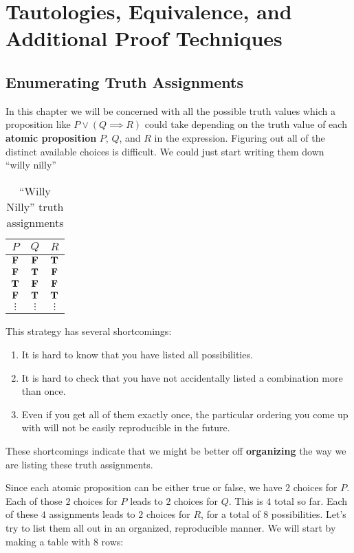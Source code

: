 \chapter{Tautologies, Equivalence, and Additional Proof Techniques}

\section{Enumerating Truth Assignments}

In this chapter we will be concerned with all the possible truth values which a proposition like $P \vee (Q \implies R)$ could take depending on the truth value of each \textbf{atomic proposition}  $P$, $Q$, and $R$ in the expression.  Figuring out all of the distinct available choices is difficult.  We could just start writing them down ``willy nilly''

		\begin{table}[h!]
	\begin{center}
		\caption{``Willy Nilly'' truth assignments}
		\begin{tabular}{c|c|c} 
			$P$ & $Q$ & $R$ \\
			\hline
			$\textbf{\textrm{F}}$ & $\textbf{\textrm{F}}$ & $\textbf{\textrm{T}}$ \\ 
			$\textbf{\textrm{F}}$ & $\textbf{\textrm{T}}$ & $\textbf{\textrm{F}}$ \\ 
			$\textbf{\textrm{T}}$ & $\textbf{\textrm{F}}$ & $\textbf{\textrm{F}}$ \\ 
			$\textbf{\textrm{F}}$ & $\textbf{\textrm{T}}$ & $\textbf{\textrm{T}}$ \\ 
			$\vdots$ & $\vdots$ & $\vdots$ \\ 
		\end{tabular}
	\end{center}
\end{table}

This strategy has several shortcomings:

\begin{enumerate}
		\item It is hard to know that you have listed all possibilities.
		\item It is hard to check that you have not accidentally listed a combination more than once.
		\item Even if you get all of them exactly once, the particular ordering you come up with will not be easily reproducible in the future.
		\end{enumerate}
	
These shortcomings indicate that we might be better off \textbf{organizing} the way we are listing these truth assignments.

Since each atomic proposition can be either true or false, we have $2$ choices for $P$.  Each of those $2$ choices for $P$ leads to $2$ choices for $Q$.  This is $4$ total so far.  Each of these $4$ assignments leads to $2$ choices for $R$, for a total of $8$ possibilities.  Let's try to list them all out in an organized, reproducible manner.  We will start by making a table with 8 rows:

